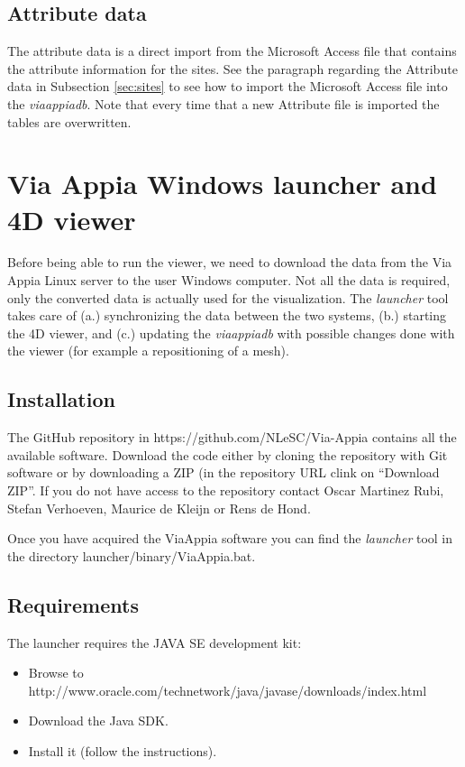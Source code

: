 \documentclass[a4paper,11pt]{article}
\begin{document}
\subsection{Attribute data}

The attribute data is a direct import from the Microsoft Access file that contains the attribute information for the sites. See the paragraph regarding the Attribute data in Subsection \ref{sec:sites} to see how to import the Microsoft Access file into the \textit{viaappiadb}. Note that every time that a new Attribute file is imported the tables are overwritten.

\section{Via Appia Windows launcher and 4D viewer}
\label{sec:viewer}

Before being able to run the viewer, we need to download the data from the Via Appia Linux server to the user Windows computer. Not all the data is required, only the converted data is actually used for the visualization. The \textit{launcher} tool takes care of (a.) synchronizing the data between the two systems, (b.) starting the 4D viewer, and (c.) updating the \textit{viaappiadb} with possible changes done with the viewer (for example a repositioning of a mesh).

\subsection{Installation}
\label{sec:install}

The GitHub repository in https://github.com/NLeSC/Via-Appia contains all the available software. Download the code either by cloning the repository with Git software or by downloading a ZIP (in the repository URL clink on ``Download ZIP''. If you do not have access to the repository contact Oscar Martinez Rubi, Stefan Verhoeven, Maurice de Kleijn or Rens de Hond.

Once you have acquired the ViaAppia software you can find the \textit{launcher} tool in the directory launcher/binary/ViaAppia.bat. 

\subsection{Requirements}

The launcher requires the JAVA SE development kit:
\begin{itemize}
\item Browse to http://www.oracle.com/technetwork/java/javase/downloads/index.html
\item Download the Java SDK.
\item Install it (follow the instructions).
\end{itemize} 
\end{document}
